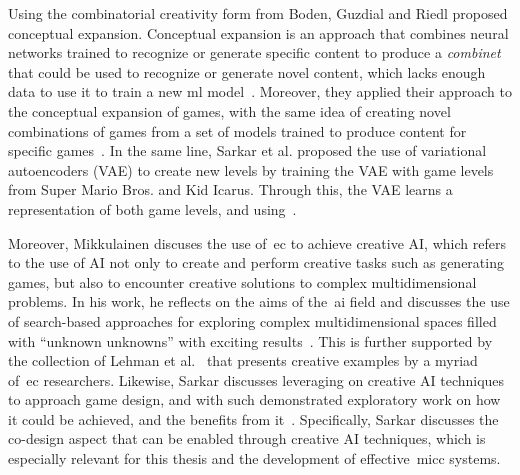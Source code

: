 Using the combinatorial creativity form from Boden, Guzdial and Riedl proposed conceptual expansion. Conceptual expansion is an approach that combines neural networks trained to recognize or generate specific content to produce a \textit{combinet} that could be used to recognize or generate novel content, which lacks enough data to use it to train a new ml model~\cite{guzdial_combinets_2018}. Moreover, they applied their approach to the conceptual expansion of games, with the same idea of creating novel combinations of games from a set of models trained to produce content for specific games~\cite{guzdial_conceptual_2020}. In the same line, Sarkar et al. proposed the use of variational autoencoders (VAE) to create new levels by training the VAE with game levels from Super Mario Bros. and Kid Icarus. Through this, the VAE learns a representation of both game levels, and using~\cite{sarkar_controllable_2019,sarkar_generating_2021}.

Moreover, Mikkulainen discuses the use of~\acrlong{ec} to achieve creative AI, which refers to the use of AI not only to create and perform creative tasks such as generating games, but also to encounter creative solutions to complex multidimensional problems. In his work, he reflects on the aims of the~\acrshort{ai} field and discusses the use of search-based approaches for exploring complex multidimensional spaces filled with ``unknown unknowns'' with exciting results~\cite{miikkulainen_creative_2021}. This is further supported by the collection of Lehman et al.~\cite{lehman_surprising_2020} that presents creative examples by a myriad of~\acrshort{ec} researchers. Likewise, Sarkar discusses leveraging on creative AI techniques to approach game design, and with such demonstrated exploratory work on how it could be achieved, and the benefits from it~\cite{sarkar_game_2019}. Specifically, Sarkar discusses the co-design aspect that can be enabled through creative AI techniques, which is especially relevant for this thesis and the development of effective~\acrshort{micc} systems.





